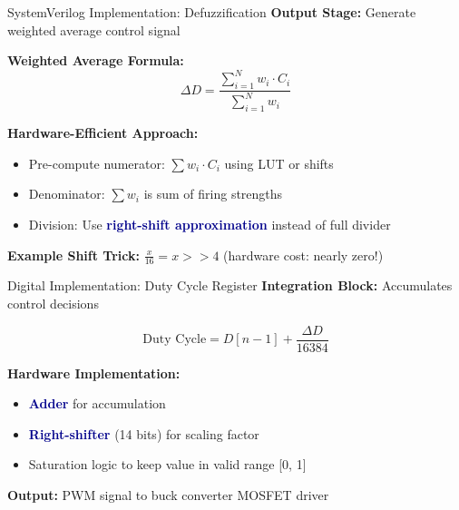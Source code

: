 \documentclass[aspectratio=169,usenames,dvipsnames]{beamer}
\newcommand{\highlight}[1]{\textcolor{darkblue}{\textbf{#1}}}
\begin{document}
\begin{frame}{SystemVerilog Implementation: Defuzzification}
    \textbf{Output Stage:} Generate weighted average control signal
    
    \vspace{0.3cm}
    \textbf{Weighted Average Formula:}
    \[\Delta D = \frac{\sum_{i=1}^{N} w_i \cdot C_i}{\sum_{i=1}^{N} w_i}\]
    
    \vspace{0.3cm}
    \textbf{Hardware-Efficient Approach:}
    \begin{itemize}
        \item Pre-compute numerator: $\sum w_i \cdot C_i$ using LUT or shifts
        \item Denominator: $\sum w_i$ is sum of firing strengths
        \item Division: Use \highlight{right-shift approximation} instead of full divider
    \end{itemize}
    
    \vspace{0.3cm}
    \textbf{Example Shift Trick:} $\frac{x}{16} = x >> 4$ (hardware cost: nearly zero!)
\end{frame}

\begin{frame}{Digital Implementation: Duty Cycle Register}
    \textbf{Integration Block:} Accumulates control decisions
    
    \vspace{0.3cm}
    \[\text{Duty Cycle} = D[n-1] + \frac{\Delta D}{16384}\]
    
    \vspace{0.3cm}
    \textbf{Hardware Implementation:}
    \begin{itemize}
        \item \highlight{Adder} for accumulation
        \item \highlight{Right-shifter} (14 bits) for scaling factor
        \item Saturation logic to keep value in valid range [0, 1]
    \end{itemize}
    
    \vspace{0.3cm}
    \textbf{Output:} PWM signal to buck converter MOSFET driver
\end{frame}
\end{document}
